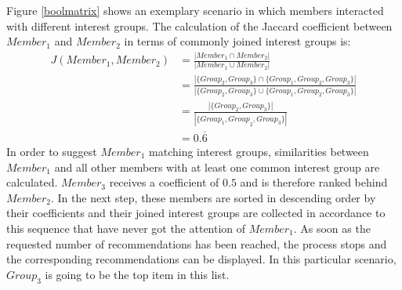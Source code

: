 \documentclass[12pt,numbers=noenddot,parskip,bibliography=totocnumbered,listof=totocnumbered,draft]{scrreprt}
\begin{document}
Figure \ref{boolmatrix} shows an exemplary scenario in which members interacted with different interest groups. The calculation of the Jaccard coefficient between $\mathit{Member}_1$ and $\mathit{Member}_2$ in terms of commonly joined interest groups is:
\begin{align*}
J(\mathit{Member}_1, \mathit{Member}_2) &= \frac{|\mathit{Member}_1 \cap \mathit{Member}_2|}{|\mathit{Member}_1 \cup \mathit{Member}_2|} \\ &= \frac{|\{\mathit{Group}_2, \mathit{Group}_3\} \cap \{\mathit{Group}_1, \mathit{Group}_2, \mathit{Group}_3\}|}{|\{\mathit{Group}_2, \mathit{Group}_3\} \cup \{\mathit{Group}_1, \mathit{Group}_2, \mathit{Group}_3\}|} \\ &= \frac{|\{\mathit{Group}_2, \mathit{Group}_3\}|}{|\{\mathit{\mathit{Group}_1, Group}_2, \mathit{Group}_3\}|} \\ &= 0.\overline{6}
\end{align*}
In order to suggest $\mathit{Member}_1$ matching interest groups, similarities between $\mathit{Member}_1$ and all other members with at least one common interest group are calculated. $\mathit{Member}_3$ receives a coefficient of $\mathsf{0.5}$ and is therefore ranked behind $\mathit{Member}_2$. In the next step, these members are sorted in descending order by their coefficients and their joined interest groups are collected in accordance to this sequence that have never got the attention of $\mathit{Member}_1$. As soon as the requested number of recommendations has been reached, the process stops and the corresponding recommendations can be displayed. In this particular scenario, $\mathit{Group}_3$ is going to be the top item in this list.
\end{document}
